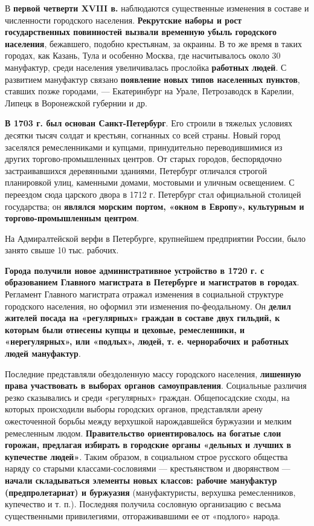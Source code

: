 \documentclass{article}
\begin{document}
В \textbf{первой четверти XVIII в.} наблюдаются существенные изменения в составе и численности городского населения. \textbf{Рекрутские наборы и рост государственных повинностей вызвали временную убыль городского населения}, бежавшего, подобно крестьянам, за окраины. В то же время в таких городах, как Казань, Тула и особенно Москва, где насчитывалось около 30 мануфактур, среди населения увеличивалась прослойка \textbf{работных людей}. С развитием мануфактур связано \textbf{появление новых типов населенных пунктов}, ставших позже городами, — Екатеринбург на Урале, Петрозаводск в Карелии, Липецк в Воронежской губернии и др.

\hfill

\textbf{В 1703 г. был основан Санкт-Петербург}. Его строили в тяжелых условиях десятки тысяч солдат и крестьян, согнанных со всей страны. Новый город заселялся ремесленниками и купцами, принудительно переводившимися из других торгово-промышленных центров. От старых городов, беспорядочно застраивавшихся деревянными зданиями, Петербург отличался строгой планировкой улиц, каменными домами, мостовыми и уличным освещением. С переездом сюда царского двора в 1712 г. Петербург стал официальной столицей государства; он \textbf{являлся морским портом, «окном в Европу», культурным и торгово-промышленным центром}.

На Адмиралтейской верфи в Петербурге, крупнейшем предприятии России, было занято свыше 10 тыс. рабочих.

\hfill

\textbf{Города получили новое административное устройство в 1720 г. с образованием Главного магистрата в Петербурге и магистратов в городах}. Регламент Главного магистрата отражал изменения в социальной структуре городского населения, но оформил эти изменения по-феодальному. Он \textbf{делил жителей посада на «регулярных» граждан в составе двух гильдий, к которым были отнесены купцы и цеховые, ремесленники, и «нерегулярных», или «подлых», людей, т. е. чернорабочих и работных людей мануфактур}.

Последние представляли обездоленную массу городского населения, \textbf{лишенную права участвовать в выборах органов самоуправления}. Социальные различия резко сказывались и среди «регулярных» граждан. Общепосадские сходы, на которых происходили выборы городских органов, представляли арену ожесточенной борьбы между верхушкой нарождавшейся буржуазии и мелким ремесленным людом. \textbf{Правительство ориентировалось на богатые слои горожан, предлагая избирать в городские органы «дельных и лучших в купечестве людей»}. Таким образом, в социальном строе русского общества наряду со старыми классами-сословиями — крестьянством и дворянством — \textbf{начали складываться элементы новых классов: рабочие мануфактур (предпролетариат) и буржуазия} (мануфактуристы, верхушка ремесленников, купечество и т. п.). Последняя получила сословную организацию с весьма существенными привилегиями, отгораживавшими ее от «подлого» народа.
\end{document}
